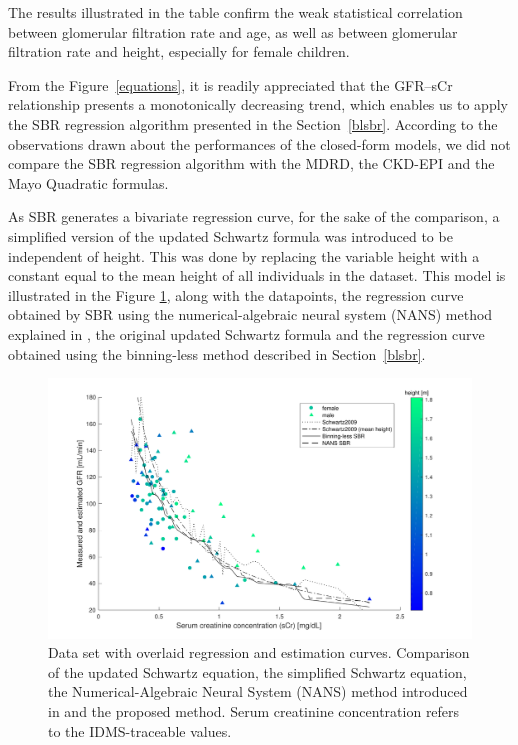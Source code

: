 \documentclass[10pt,final]{siamltex}
\begin{document}
%
The results illustrated in the table confirm the weak statistical correlation between glomerular filtration rate and age, as well as between glomerular filtration rate and height, especially for female children.

From the Figure~\ref{equations}, it is readily appreciated that the GFR--sCr relationship presents a monotonically decreasing trend, which enables us to apply the SBR regression algorithm presented in the Section~\ref{blsbr}. According to the observations drawn about the performances of the closed-form models, we did not compare the SBR regression algorithm with the MDRD, the CKD-EPI and the Mayo Quadratic formulas.

As SBR generates a bivariate regression curve, for the sake of the comparison, a simplified version of the updated Schwartz formula was introduced to be independent of height. This was done by replacing the variable height with a constant equal to the mean height of all individuals in the dataset. This model is illustrated in the Figure \ref{regression}, along with the datapoints, the regression curve obtained by SBR using the numerical-algebraic neural system (NANS) method explained in \cite{fiori}, the original updated Schwartz formula and the regression curve obtained using the binning-less method described in Section~\ref{blsbr}.
%
\begin{figure}[ht]
  \centering
  \includegraphics[scale=0.6]{figures/regression}
  \caption{Data set with overlaid regression and estimation curves. Comparison of the updated Schwartz equation, the simplified Schwartz equation, the Numerical-Algebraic Neural System (NANS) method introduced in \cite{fiori} and the proposed method. Serum creatinine concentration refers to the IDMS-traceable values.}
  \label{regression}
\end{figure}
\end{document}
